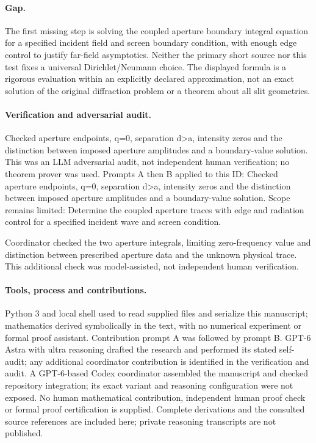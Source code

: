 \documentclass[11pt]{article}
\begin{document}
\paragraph{Gap.}The first missing step is solving the coupled aperture boundary integral equation for a specified incident field and screen boundary condition, with enough edge control to justify far-field asymptotics. Neither the primary short source nor this test fixes a universal Dirichlet/Neumann choice. The displayed formula is a rigorous evaluation within an explicitly declared approximation, not an exact solution of the original diffraction problem or a theorem about all slit geometries.

\paragraph{Verification and adversarial audit.}
Checked aperture endpoints, q=0, separation d>a, intensity zeros and the distinction between imposed aperture amplitudes and a boundary-value solution. This was an LLM adversarial audit, not independent human verification; no theorem prover was used. Prompts A then B applied to this ID: Checked aperture endpoints, q=0, separation d>a, intensity zeros and the distinction between imposed aperture amplitudes and a boundary-value solution. Scope remains limited: Determine the coupled aperture traces with edge and radiation control for a specified incident wave and screen condition.

Coordinator checked the two aperture integrals, limiting zero-frequency value and distinction between prescribed aperture data and the unknown physical trace. This additional check was model-assisted, not independent human verification.

\paragraph{Tools, process and contributions.}
Python 3 and local shell used to read supplied files and serialize this manuscript; mathematics derived symbolically in the text, with no numerical experiment or formal proof assistant. Contribution prompt A was followed by prompt B. GPT-6 Astra with ultra reasoning drafted the research and performed its stated self-audit; any additional coordinator contribution is identified in the verification and audit. A GPT-6-based Codex coordinator assembled the manuscript and checked repository integration; its exact variant and reasoning configuration were not exposed. No human mathematical contribution, independent human proof check or formal proof certification is supplied. Complete derivations and the consulted source references are included here; private reasoning transcripts are not published.
\end{document}
